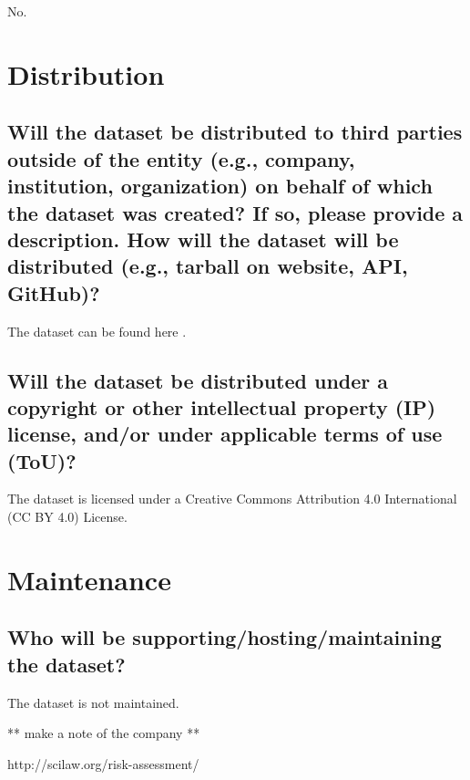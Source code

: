 \documentclass[letterpaper, 10 pt, conference]{ieeeconf}  %
\begin{document}
No.

\section{Distribution}
\subsection{Will the dataset be distributed to third parties outside of the entity (e.g., company, institution, organization) on behalf of which the dataset was created? If so, please provide a description. How will the dataset will be distributed (e.g., tarball on website, API, GitHub)?}

The dataset can be found here \cite{Neulaw}.

\subsection{Will the dataset be distributed under a copyright or other intellectual property (IP) license, and/or under applicable terms of use (ToU)?}

The dataset is licensed under a Creative Commons Attribution 4.0 International (CC BY 4.0) License.

\section{Maintenance}

\subsection{Who will be supporting/hosting/maintaining the dataset?}

The dataset is not maintained.

** make a note of the company ** 

http://scilaw.org/risk-assessment/
\medskip
 
  

\end{document}
